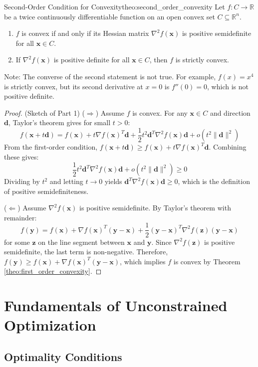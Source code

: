 \documentclass{MathNote}
\begin{document}
\begin{theorem}{Second-Order Condition for Convexity}{theo:second_order_convexity}
	Let $f: C \to \mathbb{R}$ be a twice continuously differentiable function on an open convex set $C \subseteq \mathbb{R}^n$.
	\begin{enumerate}
		\item $f$ is convex if and only if its Hessian matrix $\nabla^2 f(\bm{x})$ is positive semidefinite for all $\bm{x} \in C$.
		\item If $\nabla^2 f(\bm{x})$ is positive definite for all $\bm{x} \in C$, then $f$ is strictly convex.
	\end{enumerate}
	Note: The converse of the second statement is not true. For example, $f(x)=x^4$ is strictly convex, but its second derivative at $x=0$ is $f''(0)=0$, which is not positive definite.
\end{theorem}
\begin{proof} (Sketch of Part 1)
	($\Rightarrow$) Assume $f$ is convex. For any $\bm{x} \in C$ and direction $\bm{d}$, Taylor's theorem gives for small $t>0$:
	$$ f(\bm{x}+t\bm{d}) = f(\bm{x}) + t\nabla f(\bm{x})^T\bm{d} + \frac{1}{2}t^2\bm{d}^T\nabla^2 f(\bm{x})\bm{d} + o(t^2\|\bm{d}\|^2) $$
	From the first-order condition, $f(\bm{x}+t\bm{d}) \ge f(\bm{x}) + t\nabla f(\bm{x})^T\bm{d}$. Combining these gives:
	$$ \frac{1}{2}t^2\bm{d}^T\nabla^2 f(\bm{x})\bm{d} + o(t^2\|\bm{d}\|^2) \ge 0 $$
	Dividing by $t^2$ and letting $t \to 0$ yields $\bm{d}^T\nabla^2 f(\bm{x})\bm{d} \ge 0$, which is the definition of positive semidefiniteness.

	($\Leftarrow$) Assume $\nabla^2 f(\bm{x})$ is positive semidefinite. By Taylor's theorem with remainder:
	$$ f(\bm{y}) = f(\bm{x}) + \nabla f(\bm{x})^T(\bm{y}-\bm{x}) + \frac{1}{2}(\bm{y}-\bm{x})^T \nabla^2 f(\bm{z})(\bm{y}-\bm{x}) $$
	for some $\bm{z}$ on the line segment between $\bm{x}$ and $\bm{y}$. Since $\nabla^2 f(\bm{z})$ is positive semidefinite, the last term is non-negative. Therefore, $f(\bm{y}) \ge f(\bm{x}) + \nabla f(\bm{x})^T(\bm{y}-\bm{x})$, which implies $f$ is convex by Theorem \ref{theo:first_order_convexity}.
\end{proof}


\section{Fundamentals of Unconstrained Optimization}

\subsection{Optimality Conditions}
\end{document}
